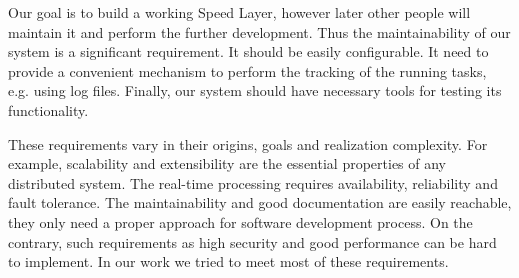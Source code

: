 Our goal is to build a working Speed Layer, however later other people will maintain it and perform the further development.
Thus the maintainability of our system is a significant requirement.
It should be easily configurable.
It need to provide a convenient mechanism to perform the tracking of the running tasks, e.g. using log files.
Finally, our system should have necessary tools for testing its functionality.

These requirements vary in their origins, goals and realization complexity.
For example, scalability and extensibility are the essential properties of any distributed system.
The real-time processing requires availability, reliability and fault tolerance.
The maintainability and good documentation are easily reachable, they only need a proper approach for software development process.
On the contrary, such requirements as high security and good performance can be hard to implement.
In our work we tried to meet most of these requirements.  
